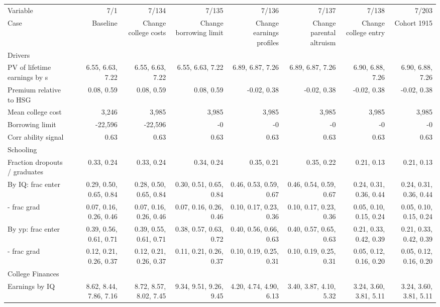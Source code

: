 \begin{tabular}{lrrrrrrr}
\hline
Variable & 7/1  & 7/134  & 7/135  & 7/136  & 7/137  & 7/138  & 7/203  \\ 
Case & Baseline  & Change college costs  & Change borrowing limit  & Change earnings profiles  & Change parental altruism  & Change college entry  & Cohort 1915  \\ 
Drivers &   &   &   &   &   &   &   \\ 
PV of lifetime earnings by s & 6.55, 6.63, 7.22  & 6.55, 6.63, 7.22  & 6.55, 6.63, 7.22  & 6.89, 6.87, 7.26  & 6.89, 6.87, 7.26  & 6.90, 6.88, 7.26  & 6.90, 6.88, 7.26  \\ 
Premium relative to HSG & 0.08, 0.59  & 0.08, 0.59  & 0.08, 0.59  & -0.02, 0.38  & -0.02, 0.38  & -0.02, 0.38  & -0.02, 0.38  \\ 
Mean college cost & 3,246  & 3,985  & 3,985  & 3,985  & 3,985  & 3,985  & 3,985  \\ 
Borrowing limit & -22,596  & -22,596  & -0  & -0  & -0  & -0  & -0  \\ 
Corr ability signal & 0.63  & 0.63  & 0.63  & 0.63  & 0.63  & 0.63  & 0.63  \\ 
\hline
Schooling &   &   &   &   &   &   &   \\ 
Fraction dropouts / graduates & 0.33, 0.24  & 0.33, 0.24  & 0.34, 0.24  & 0.35, 0.21  & 0.35, 0.22  & 0.21, 0.13  & 0.21, 0.13  \\ 
By IQ: frac enter & 0.29, 0.50, 0.65, 0.84  & 0.28, 0.50, 0.65, 0.84  & 0.30, 0.51, 0.65, 0.84  & 0.46, 0.53, 0.59, 0.67  & 0.46, 0.54, 0.59, 0.67  & 0.24, 0.31, 0.36, 0.44  & 0.24, 0.31, 0.36, 0.44  \\ 
- frac grad & 0.07, 0.16, 0.26, 0.46  & 0.07, 0.16, 0.26, 0.46  & 0.07, 0.16, 0.26, 0.46  & 0.10, 0.17, 0.23, 0.36  & 0.10, 0.17, 0.23, 0.36  & 0.05, 0.10, 0.15, 0.24  & 0.05, 0.10, 0.15, 0.24  \\ 
By yp: frac enter & 0.39, 0.56, 0.61, 0.71  & 0.39, 0.55, 0.61, 0.71  & 0.38, 0.57, 0.63, 0.72  & 0.40, 0.56, 0.66, 0.63  & 0.40, 0.57, 0.65, 0.63  & 0.21, 0.33, 0.42, 0.39  & 0.21, 0.33, 0.42, 0.39  \\ 
- frac grad & 0.12, 0.21, 0.26, 0.37  & 0.12, 0.21, 0.26, 0.37  & 0.11, 0.21, 0.26, 0.37  & 0.10, 0.19, 0.25, 0.31  & 0.10, 0.19, 0.25, 0.31  & 0.05, 0.12, 0.16, 0.20  & 0.05, 0.12, 0.16, 0.20  \\ 
\hline
College Finances &   &   &   &   &   &   &   \\ 
Earnings by IQ & 8.62, 8.44, 7.86, 7.16  & 8.72, 8.57, 8.02, 7.45  & 9.34, 9.51, 9.26, 9.45  & 4.20, 4.74, 4.90, 6.13  & 3.40, 3.87, 4.10, 5.32  & 3.24, 3.60, 3.81, 5.11  & 3.24, 3.60, 3.81, 5.11  \\ 

\end{tabular}

